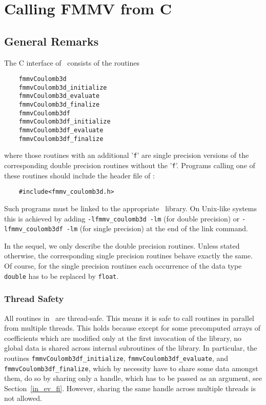 \section{Calling FMMV from C}\label{cinterface}
\subsection{General Remarks}
The C interface of \fmmv\ consists of the routines
\begin{verbatim}
    fmmvCoulomb3d
    fmmvCoulomb3d_initialize
    fmmvCoulomb3d_evaluate
    fmmvCoulomb3d_finalize
    fmmvCoulomb3df
    fmmvCoulomb3df_initialize
    fmmvCoulomb3df_evaluate
    fmmvCoulomb3df_finalize
\end{verbatim}
where those routines with an additional '\verb|f|' are single precision
versions of the corresponding double precision routines without
the '\verb|f|'.
Programs calling one of these routines should include the header file
of \fmmv:
\begin{verbatim}
    #include<fmmv_coulomb3d.h>
\end{verbatim}
Such programs must be linked to the appropriate \fmmv\ library. On Unix-like
systems this is achieved by adding \verb|-lfmmv_coulomb3d -lm| 
(for double precision) or \verb|-lfmmv_coulomb3df -lm|
(for single precision) at the end of the link command.

In the sequel, we only describe the double precision routines.
Unless stated otherwise, the corresponding single precision routines 
behave exactly the same. Of course, for the single precision routines 
each occurrence of
the data type \verb|double| has to be replaced by \verb|float|.

\subsubsection*{Thread Safety}
All routines in \fmmv\ are thread-safe. This means it is safe to
call routines in parallel from multiple threads. This holds because
except for some precomputed arrays of coefficients which are modified only
at the first invocation of the library, no global data is shared across
internal subroutines of the library.
In particular, the routines  \verb|fmmvCoulomb3df_initialize|,
    \verb|fmmvCoulomb3df_evaluate|, and
    \verb|fmmvCoulomb3df_finalize|, which by necessity have
to share some data amongst them, do so by sharing only a handle, which has
to be passed as an argument, see Section~\ref{in_ev_fi}. However, sharing
the same handle across multiple threads is not  allowed.

